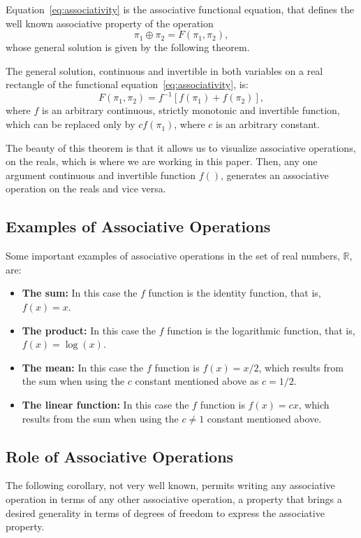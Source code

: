 \documentclass[
	11pt, %
	fleqn, %
	a4paper, %
]{LegrandOrangeBook}
\newcommand{\R}{\mathbb{R}}
\begin{document}
Equation~\eqref{eq:associativity} is the associative functional equation, that defines the well known associative property of the operation
\begin{equation}
\pi_1 \oplus \pi_2 = F(\pi_1,\pi_2),
\label{eq:operationdef}
\end{equation}
whose general solution is given by the following theorem.

\begin{theorem}
\label{thm:associativity}
The general solution, continuous and invertible in both variables on a real rectangle of the functional equation~\eqref{eq:associativity}, is:
\begin{equation}
F(\pi_1,\pi_2) = f^{-1}[f(\pi_1) + f(\pi_2)],
\label{eq:associativesolution}
\end{equation}
where $f$ is an arbitrary continuous, strictly monotonic and invertible function, which can be replaced only by $cf(\pi_1)$, where $c$ is an arbitrary constant.
\end{theorem}

The beauty of this theorem is that it allows us to visualize associative operations, on the reals, which is where we are working in this paper. Then, any one argument continuous and invertible function $f()$, generates an associative operation on the reals and vice versa.

\subsection{Examples of Associative Operations}
Some important examples of associative operations in the set of real numbers, $\R$, are:
\begin{itemize}
\item \textbf{The sum:} In this case the $f$ function is the identity function, that is, $f(x) = x$.
\item \textbf{The product:} In this case the $f$ function is the logarithmic function, that is, $f(x) = \log(x)$.
\item \textbf{The mean:} In this case the $f$ function is $f(x) = x/2$, which results from the sum when using the $c$ constant mentioned above as $c = 1/2$.
\item \textbf{The linear function:} In this case the $f$ function is $f(x) = cx$, which results from the sum when using the $c \neq 1$ constant mentioned above.
\end{itemize}

\subsection{Role of Associative Operations}
The following corollary, not very well known, permits writing any associative operation in terms of any other associative operation, a property that brings a desired generality in terms of degrees of freedom to express the associative property.
\end{document}
